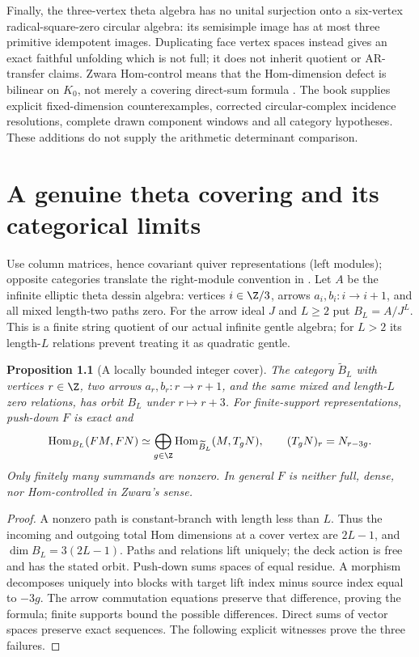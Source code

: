 \documentclass[11pt,oneside,openany]{book}
\newtheorem{proposition}[theorem]{Proposition}
\theoremstyle{definition}\newtheorem{definition}[theorem]{Definition}
\theoremstyle{remark}\newtheorem{remark}[theorem]{Remark}
\begin{document}
Finally, the three-vertex theta algebra has no unital surjection onto a six-vertex radical-square-zero circular algebra: its semisimple image has at most three primitive idempotent images. Duplicating face vertex spaces instead gives an exact faithful unfolding which is not full; it does not inherit quotient or AR-transfer claims. Zwara Hom-control means that the Hom-dimension defect is bilinear on $K_0$, not merely a covering direct-sum formula \cite{ZwaraCorrected,RiedtmannZwaraCorrected}. The book supplies explicit fixed-dimension counterexamples, corrected circular-complex incidence resolutions, complete drawn component windows and all category hypotheses. These additions do not supply the arithmetic determinant comparison.



\chapter{A genuine theta covering and its categorical limits}
\label{cover:section}
Use column matrices, hence covariant quiver representations (left modules);
opposite categories translate the right-module convention in
\cite{CoveringLecture2026}. Let $A$ be the infinite elliptic theta dessin
algebra: vertices $i\in\Z/3$, arrows $a_i,b_i:i\to i+1$, and all mixed
length-two paths zero. For the arrow ideal $J$ and $L\geq2$ put $B_L=A/J^L$.
This is a finite string quotient of our actual infinite gentle algebra;
for $L>2$ its length-$L$ relations prevent treating it as quadratic gentle.

\begin{proposition}[A locally bounded integer cover]\label{cover:hom}
The category $\widetilde B_L$ with vertices $r\in\Z$, two arrows
$a_r,b_r:r\to r+1$, and the same mixed and length-$L$ zero relations,
has orbit $B_L$ under $r\mapsto r+3$. For finite-support representations,
push-down $F$ is exact and
\[
 \operatorname{Hom}_{B_L}(FM,FN)
 \simeq\bigoplus_{g\in\Z}
       \operatorname{Hom}_{\widetilde B_L}(M,T_gN),\qquad
 (T_gN)_r=N_{r-3g}.
\]
Only finitely many summands are nonzero. In general $F$ is neither full,
dense, nor Hom-controlled in Zwara's sense.
\end{proposition}
\begin{proof}
A nonzero path is constant-branch with length less than $L$.
Thus the incoming and outgoing total Hom dimensions at a cover vertex are
$2L-1$, and $\dim B_L=3(2L-1)$. Paths and relations lift uniquely; the
deck action is free and has the stated orbit. Push-down sums spaces of equal
residue. A morphism decomposes uniquely into blocks with target lift index
minus source index equal to $-3g$. The arrow commutation equations preserve
that difference, proving the formula; finite supports bound the possible
differences. Direct sums of vector spaces preserve exact sequences.
The following explicit witnesses prove the three failures.
\end{proof}
\end{document}
